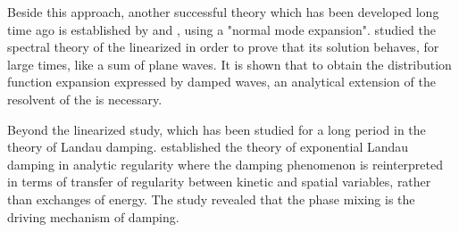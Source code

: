 {Beside this approach, another successful theory which has been developed long time ago is established by \cite{kampen_theory_1955} and \cite{case_plasma_1959}, using a 
"normal mode expansion".  
\cite{degond_spectral_1986} studied the spectral theory of the linearized \eqvp in order to prove that its solution behaves, for large times, like a sum of plane waves. It is shown that to obtain the distribution function expansion expressed by damped waves, an analytical extension of the resolvent of the \eqvp  is necessary. 

Beyond the linearized study, which has been studied for a long period in the theory of Landau damping. \cite{mouhot2011} established the theory of exponential Landau damping in analytic regularity where the damping phenomenon is reinterpreted in terms of transfer of regularity between kinetic and spatial variables, rather than exchanges of energy. The study revealed that the phase mixing is the driving mechanism of damping.






}
